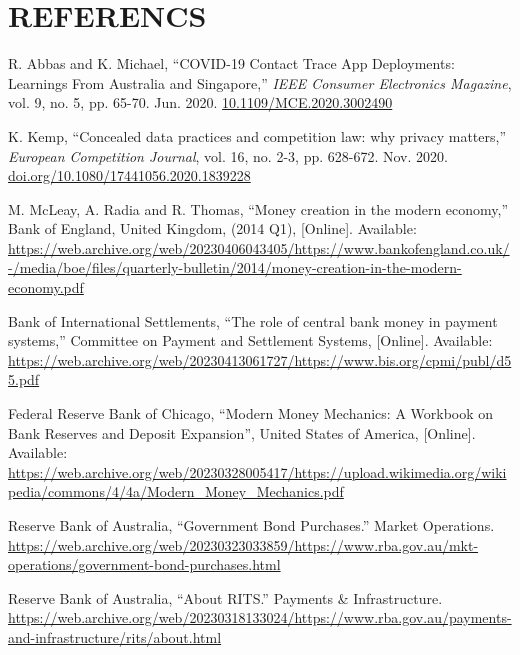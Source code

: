 \section*{REFERENCS}
\scriptsize
\begin{enumerate}[leftmargin=0.75cm,label={[\arabic*]}]

\item R. Abbas and K. Michael, ``COVID-19 Contact Trace App Deployments: Learnings From Australia and Singapore,'' \textit{IEEE Consumer Electronics Magazine}, vol. 9, no. 5,  pp. 65-70. Jun. 2020. \url{10.1109/MCE.2020.3002490}

\item K. Kemp, ``Concealed data practices and competition law: why privacy matters,'' \textit{European Competition Journal}, vol. 16, no. 2-3, pp. 628-672. Nov. 2020. \url{doi.org/10.1080/17441056.2020.1839228}

  \item M. McLeay, A. Radia and R. Thomas, ``Money creation in the modern economy,'' Bank of England, United Kingdom, (2014 Q1), [Online]. Available: \url{https://web.archive.org/web/20230406043405/https://www.bankofengland.co.uk/-/media/boe/files/quarterly-bulletin/2014/money-creation-in-the-modern-economy.pdf}

  \item Bank of International Settlements, ``The role of central bank money in payment systems,'' Committee on Payment and Settlement Systems, [Online]. Available: \url{https://web.archive.org/web/20230413061727/https://www.bis.org/cpmi/publ/d55.pdf}
  
  \item Federal Reserve Bank of Chicago, ``Modern Money Mechanics: A Workbook on Bank Reserves and Deposit Expansion'', United States of America, [Online]. Available: \url{https://web.archive.org/web/20230328005417/https://upload.wikimedia.org/wikipedia/commons/4/4a/Modern\_Money\_Mechanics.pdf}
  
  \item Reserve Bank of Australia, ``Government Bond Purchases.'' Market Operations. \url{https://web.archive.org/web/20230323033859/https://www.rba.gov.au/mkt-operations/government-bond-purchases.html}
  
  \item Reserve Bank of Australia, ``About RITS.'' Payments \& Infrastructure. \url{https://web.archive.org/web/20230318133024/https://www.rba.gov.au/payments-and-infrastructure/rits/about.html}
  

\end{enumerate}
